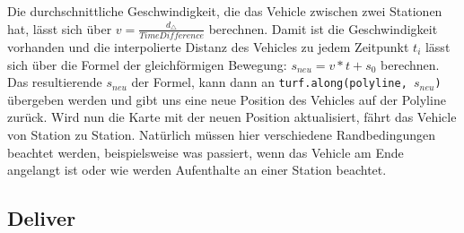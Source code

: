\begin{newpage}
      Die durchschnittliche Geschwindigkeit, die das Vehicle zwischen zwei Stationen hat, lässt sich über $v = \frac{d_\triangle}{TimeDifference}$ berechnen. Damit ist die Geschwindigkeit vorhanden und die interpolierte Distanz des Vehicles zu jedem Zeitpunkt $t_i$ lässt sich über die Formel der gleichförmigen Bewegung: $s_{neu} = v * t + s_0$ berechnen. Das resultierende $s_{neu}$ der Formel, kann dann an \texttt{turf.along(polyline, $s_{neu}$)} übergeben werden und gibt uns eine neue Position des Vehicles auf der Polyline zurück. Wird nun die Karte mit der neuen Position aktualisiert, fährt das Vehicle von Station zu Station. Natürlich müssen hier verschiedene Randbedingungen beachtet werden, beispielsweise was passiert, wenn das Vehicle am Ende angelangt ist oder wie werden Aufenthalte an einer Station beachtet.
      
      
      


    \subsection{Deliver}
    \label{sub:deliver}
      

    
\end{newpage}